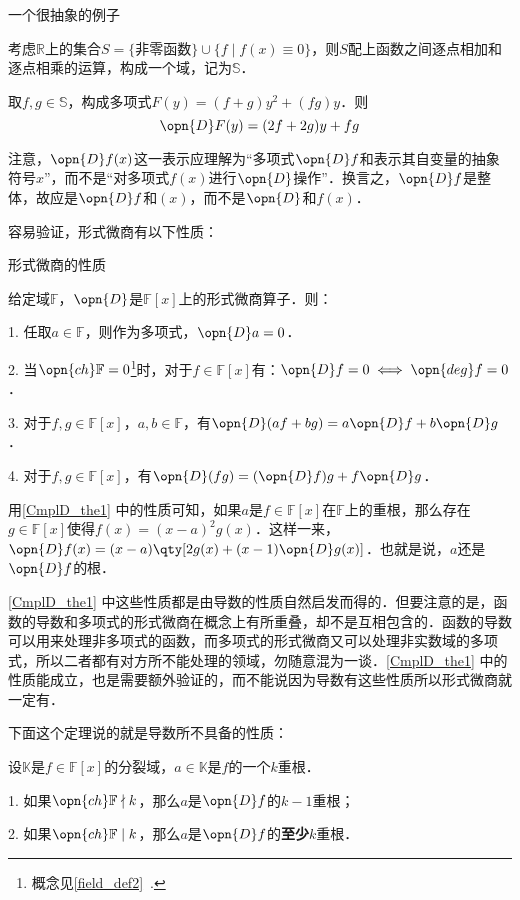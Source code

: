 \begin{example}{一个很抽象的例子}

考虑$\mathbb{R}$上的集合$S=\{\text{非零函数}\}\cup\{f\mid f(x)\equiv 0\}$，则$S$配上函数之间逐点相加和逐点相乘的运算，构成一个域，记为$\mathbb{S}$．

取$f, g\in\mathbb{S}$，构成多项式$F(y)=(f+g)y^2+(fg)y$．则
\begin{equation}
\opn{D}F(y) = (2f+2g)y+fg
\end{equation}

\end{example}

注意，$\opn{D}f(x)$这一表示应理解为“多项式$\opn{D}f$和表示其自变量的抽象符号$x$”，而不是“对多项式$f(x)$进行$\opn{D}$操作”．换言之，$\opn{D}f$是整体，故应是$\opn{D}f$和$(x)$，而不是$\opn{D}$和$f(x)$．

容易验证，形式微商有以下性质：

\begin{theorem}{形式微商的性质}\label{CmplD_the1}

给定域$\mathbb{F}$，$\opn{D}$是$\mathbb{F}[x]$上的形式微商算子．则：

1. 任取$a\in\mathbb{F}$，则作为多项式，$\opn{D}a=0$．

2. 当$\opn{ch}\mathbb{F}=0$\footnote{概念见\autoref{field_def2}~. }时，对于$f\in\mathbb{F}[x]$有：$\opn{D}f=0 \iff \opn{deg}f=0$．

3. 对于$f, g\in\mathbb{F}[x]$，$a, b\in\mathbb{F}$，有$\opn{D}(af+bg)=a\opn{D}f+b\opn{D}g$．

4. 对于$f, g\in\mathbb{F}[x]$，有$\opn{D}(fg) = (\opn{D}f)g+f\opn{D}g$．

\end{theorem}

用\autoref{CmplD_the1} 中的性质可知，如果$a$是$f\in\mathbb{F}[x]$在$\mathbb{F}$上的重根，那么存在$g\in\mathbb{F}[x]$使得$f(x)=(x-a)^2g(x)$．这样一来，$\opn{D}f(x)=(x-a)\qty[2g(x)+(x-1)\opn{D}g(x)]$．也就是说，$a$还是$\opn{D}f$的根．

\autoref{CmplD_the1} 中这些性质都是由导数的性质自然启发而得的．但要注意的是，函数的导数和多项式的形式微商在概念上有所重叠，却不是互相包含的．函数的导数可以用来处理非多项式的函数，而多项式的形式微商又可以处理非实数域的多项式，所以二者都有对方所不能处理的领域，勿随意混为一谈．\autoref{CmplD_the1} 中的性质能成立，也是需要额外验证的，而不能说因为导数有这些性质所以形式微商就一定有．

下面这个定理说的就是导数所不具备的性质：

\begin{theorem}{}\label{CmplD_the2}
设$\mathbb{K}$是$f\in\mathbb{F}[x]$的分裂域，$a\in\mathbb{K}$是$f$的一个$k$重根．

1. 如果$\opn{ch}\mathbb{F}\nmid k$，那么$a$是$\opn{D}f$的$k-1$重根；

2. 如果$\opn{ch}\mathbb{F}\mid k$，那么$a$是$\opn{D}f$的\textbf{至少}$k$重根．
\end{theorem}

